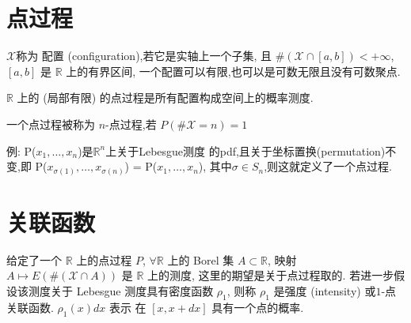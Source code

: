\theoremstyle{plain}\newtheorem*{1}{习题1}
\theoremstyle{plain}\newtheorem*{2}{习题2}
\theoremstyle{plain}\newtheorem*{3}{习题3}
\theoremstyle{plain}\newtheorem*{4}{习题4}
\theoremstyle{plain}\newtheorem*{5}{习题5}
\theoremstyle{plain}\newtheorem*{6}{习题6}
\theoremstyle{plain}\newtheorem*{7}{习题7}
\theoremstyle{plain}\newtheorem*{8}{习题8}
\theoremstyle{plain}\newtheorem*{9}{习题9}
\theoremstyle{plain}\newtheorem*{10}{习题10}
\def\E{\mathbb{E}}
\def\R{\mathbb{R}}
\def\N{\mathbb{N}}
\def\B{\mathcal{B}}
\def\M{\mathcal{M}}
\def\prob{\mathbb{P}}
\def\t{\underline{t}}
\def\c{\underline{c}}
\newtheorem{prop}{性质}




\section{点过程}

\begin{definition}
    $\mathcal{X}$称为 配置 (configuration),若它是实轴上一个子集,
且 $\#(\mathcal{X} \cap [a,b]) < +\infty$, $[a,b]$ 是 $\mathbb{R}$ 上的有界区间,
一个配置可以有限,也可以是可数无限且没有可数聚点.

$\mathbb{R}$ 上的 (局部有限) 的点过程是所有配置构成空间上的概率测度.

一个点过程被称为 $n$-点过程,若 $P(\#\mathcal{X}=n)=1$
\end{definition}

\begin{example}
    例: P($x_1, \ldots, x_n$)是$\mathbb{R}^n$上关于Lebesgue测度 的pdf,且关于坐标置换(permutation)不变,即
P($x_{\sigma(1)}, \ldots, x_{\sigma(n)}$) = P($x_1, \ldots, x_n$),
其中$\sigma \in S_n$,则这就定义了一个点过程.
\end{example}

\section{关联函数}
给定了一个 $\mathbb{R}$ 上的点过程 $P$,  $\forall \mathbb{R}$ 上的 Borel 集 $A \subset \mathbb{R}$,
映射 $A \longmapsto E(\#(\mathcal{X} \cap A))$ 是 $\mathbb{R}$ 上的测度,
这里的期望是关于点过程取的.
若进一步假设该测度关于 Lebesgue 测度具有密度函数 $\rho_1$,
则称 $\rho_1$ 是强度 (intensity) 或$1$-点关联函数.
$\rho_1(x) dx$ 表示 在 $[x,x+dx]$ 具有一个点的概率.

